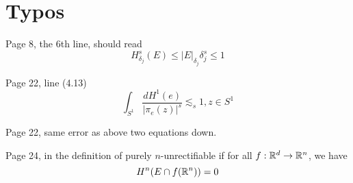 \chapter{Typos}
Page 8, the 6th line, should read 
\begin{equation*}
    H_{\delta_j}^s(E)\leq |E|_{\delta_j}\delta_j^s\leq 1
\end{equation*}


Page 22, line (4.13)
\begin{equation*}
    \int_{S^1}\frac{dH^1(e)}{|\pi_e(z)|^s}\lesssim_s 1, z\in S^1
\end{equation*}

Page 22, same error as above two equations down.

Page 24, in the definition of purely $n$-unrectifiable if for all $f:\mathbb{R}^d\to\mathbb{R}^n$, we have
\begin{equation*}
    H^n(E\cap f(\mathbb{R}^n))=0
\end{equation*}

